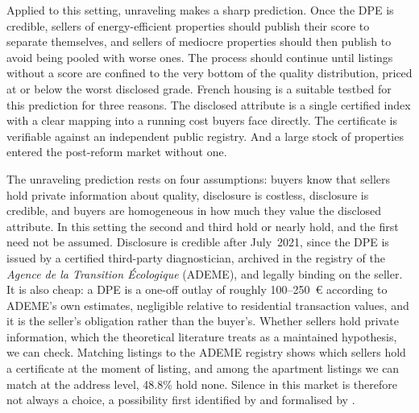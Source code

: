 Applied to this setting, unraveling makes a sharp prediction. Once the DPE is credible, sellers
of energy-efficient properties should publish their score to separate themselves, and sellers of
mediocre properties should then publish to avoid being pooled with worse ones. The process
should continue until listings without a score are confined to the very bottom of the quality
distribution, priced at or below the worst disclosed grade. French housing is a suitable
testbed for this prediction for three reasons. The disclosed attribute is a single certified index with a
clear mapping into a running cost buyers face directly. The certificate is verifiable
against an independent public registry. And a large stock of properties entered the
post-reform market without one.

The unraveling prediction rests on four assumptions: buyers know that sellers hold private
information about quality, disclosure is costless, disclosure is credible, and
buyers are homogeneous in how much they value the disclosed attribute. In this setting the second
and third hold or nearly hold, and the first need not be assumed. Disclosure is credible after
July~2021, since the DPE is issued by a certified third-party diagnostician,
archived in the registry of the \emph{Agence de la Transition \'Ecologique} (ADEME), and legally
binding on the seller. It is also cheap: a DPE is a one-off outlay of
roughly 100--250~\euro{} according to ADEME's own estimates, negligible relative to
residential transaction values, and it is the seller's obligation rather than the buyer's.
Whether sellers hold private information, which the theoretical literature treats as a maintained
hypothesis, we can check. Matching listings to the ADEME registry shows which
sellers hold a certificate at the moment of listing, and among the apartment listings we can
match at the address level, 48.8\% hold none.
Silence in this market is therefore not always a choice, a possibility first identified by
\citet{dye_disclosure_1985} and formalised by \citet{jung_kwon_1988}.

